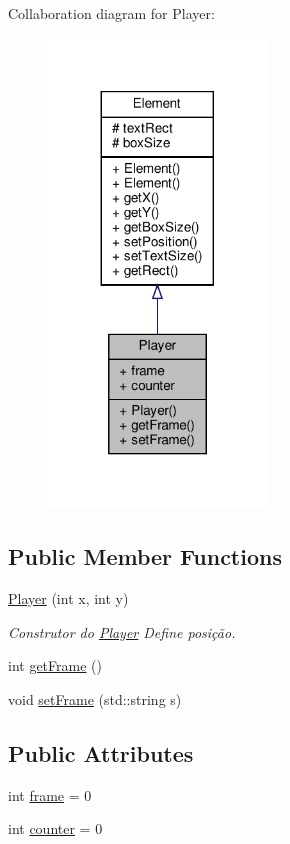 Collaboration diagram for Player\+:
\nopagebreak
\begin{figure}[H]
\begin{center}
\leavevmode
\includegraphics[width=164pt]{classPlayer__coll__graph}
\end{center}
\end{figure}
\subsection*{Public Member Functions}
\begin{DoxyCompactItemize}
\item 
\hyperlink{classPlayer_a9b009cc0bebdcc27a837d50b1f4ededd}{Player} (int x, int y)
\begin{DoxyCompactList}\small\item\em Construtor do \hyperlink{classPlayer}{Player} Define posição. \end{DoxyCompactList}\item 
int \hyperlink{classPlayer_a73374c899105e2ba7fab9340d279e3a0}{get\+Frame} ()
\item 
void \hyperlink{classPlayer_a0b5112993f246d3c0a848f3eab8db3a8}{set\+Frame} (std\+::string s)
\end{DoxyCompactItemize}
\subsection*{Public Attributes}
\begin{DoxyCompactItemize}
\item 
int \hyperlink{classPlayer_a4af20962be9096bdc5571ee9f9bf3a29}{frame} = 0
\item 
int \hyperlink{classPlayer_a03eea1e12f10153b96d2c79f906fcc14}{counter} = 0
\end{DoxyCompactItemize}
